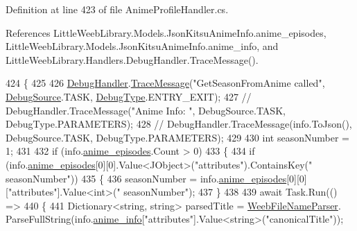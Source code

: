 Definition at line 423 of file Anime\+Profile\+Handler.\+cs.



References Little\+Weeb\+Library.\+Models.\+Json\+Kitsu\+Anime\+Info.\+anime\+\_\+episodes, Little\+Weeb\+Library.\+Models.\+Json\+Kitsu\+Anime\+Info.\+anime\+\_\+info, and Little\+Weeb\+Library.\+Handlers.\+Debug\+Handler.\+Trace\+Message().


\begin{DoxyCode}
424         \{
425 
426             \mbox{\hyperlink{class_little_weeb_library_1_1_handlers_1_1_anime_profile_handler_a0b0ae3c3838d26351485e6dfc566a632}{DebugHandler}}.\mbox{\hyperlink{interface_little_weeb_library_1_1_handlers_1_1_i_debug_handler_a2e405bc3492e683cd3702fae125221bc}{TraceMessage}}(\textcolor{stringliteral}{"GetSeasonFromAnime called"}, 
      \mbox{\hyperlink{namespace_little_weeb_library_1_1_handlers_a2a6ca0775121c9c503d58aa254d292be}{DebugSource}}.TASK, \mbox{\hyperlink{namespace_little_weeb_library_1_1_handlers_ab66019ed40462876ec4e61bb3ccb0a62}{DebugType}}.ENTRY\_EXIT);
427             \textcolor{comment}{// DebugHandler.TraceMessage("Anime Info: ", DebugSource.TASK, DebugType.PARAMETERS);}
428             \textcolor{comment}{// DebugHandler.TraceMessage(info.ToJson(), DebugSource.TASK, DebugType.PARAMETERS);}
429 
430             \textcolor{keywordtype}{int} seasonNumber = 1;
431 
432             \textcolor{keywordflow}{if} (info.\mbox{\hyperlink{class_little_weeb_library_1_1_models_1_1_json_kitsu_anime_info_ae788c0962dabe5e210fba53aecae820d}{anime\_episodes}}.Count > 0)
433             \{
434                 \textcolor{keywordflow}{if} (info.\mbox{\hyperlink{class_little_weeb_library_1_1_models_1_1_json_kitsu_anime_info_ae788c0962dabe5e210fba53aecae820d}{anime\_episodes}}[0][0].Value<JObject>(\textcolor{stringliteral}{"attributes"}).ContainsKey(\textcolor{stringliteral}{"
      seasonNumber"}))
435                 \{
436                     seasonNumber = info.\mbox{\hyperlink{class_little_weeb_library_1_1_models_1_1_json_kitsu_anime_info_ae788c0962dabe5e210fba53aecae820d}{anime\_episodes}}[0][0][\textcolor{stringliteral}{"attributes"}].Value<\textcolor{keywordtype}{int}>(\textcolor{stringliteral}{"
      seasonNumber"});
437                 \}
438 
439                 await Task.Run(() =>
440                 \{
441                     Dictionary<string, string> parsedTitle = \mbox{\hyperlink{class_little_weeb_library_1_1_handlers_1_1_anime_profile_handler_a7f6515084315842dded98b57c4f7cd22}{WeebFileNameParser}}.
      ParseFullString(info.\mbox{\hyperlink{class_little_weeb_library_1_1_models_1_1_json_kitsu_anime_info_a1a83f1d3043428e596a7a62ab36e27db}{anime\_info}}[\textcolor{stringliteral}{"attributes"}].Value<\textcolor{keywordtype}{string}>(\textcolor{stringliteral}{"canonicalTitle"}));

\end{DoxyCode}
